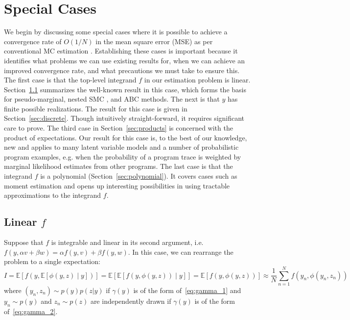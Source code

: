 
\section{Special Cases}
\label{sec:special_cases}

We begin by discussing some special cases where it is possible to achieve a
convergence rate of $O(1/N)$ in the mean square error (MSE) as per conventional
MC estimation \citep{robert2004monte}.  
Establishing these cases is important because it identifies what problems we can use existing results for,
when we can achieve an improved convergence rate, and what precautions we must take to ensure this.
The first case is that the top-level integrand $f$ in our estimation problem is linear. 
Section~\ref{sec:linear_case} summarizes the well-known result in this case, which forms the basis for pseudo-marginal, 
nested SMC \citep{andersson2015nested}, and ABC methods. The next is that $y$ has finite possible realizations.
The result for this case is given in Section~\ref{sec:discrete}. Though intuitively straight-forward, it 
requires significant care to prove. The third case in Section~\ref{sec:products} is concerned with the product of expectations.
Our result for this case is, to the best of our knowledge, new and applies to many latent variable models and a number 
of probabilistic program examples, e.g. when the probability of a program trace
is weighted by marginal likelihood estimates from other programs.
The last case is that the integrand $f$ is a polynomial (Section~\ref{sec:polynomial}). It 
covers cases such as moment estimation and opens up interesting possibilities in using tractable 
approximations to the integrand $f$.

\subsection{Linear $f$}
\label{sec:linear_case}

Suppose that $f$ 
is integrable and linear in its second argument, i.e. $f(y,\alpha v + \beta w) = 
\alpha f(y,v)+ \beta f(y,w)$.
In this case, we can rearrange the problem to a single expectation:
\[
I
 = \mathbb{E}\left[f\left(y,\mathbb{E}\left[\phi(y,z)\middle|y\right]\right)\right]
= \mathbb{E}\left[ \mathbb{E}\left[f(y,\phi(y,z))\middle|y\right]\right] = \mathbb{E}\left[f(y,\phi(y,z))\right]
 \approx\frac{1}{N} \sum_{n=1}^{N} f(y_n,\phi(y_n,z_n))
\]
where $(y_n, z_n) \sim p(y)p(z|y)$ if $\gamma(y)$ is of the form of~\eqref{eq:gamma_1} and
$y_n \sim p(y)$ and $z_n \sim p(z)$ are independently drawn if $\gamma(y)$ is of the form of~\eqref{eq:gamma_2}.

